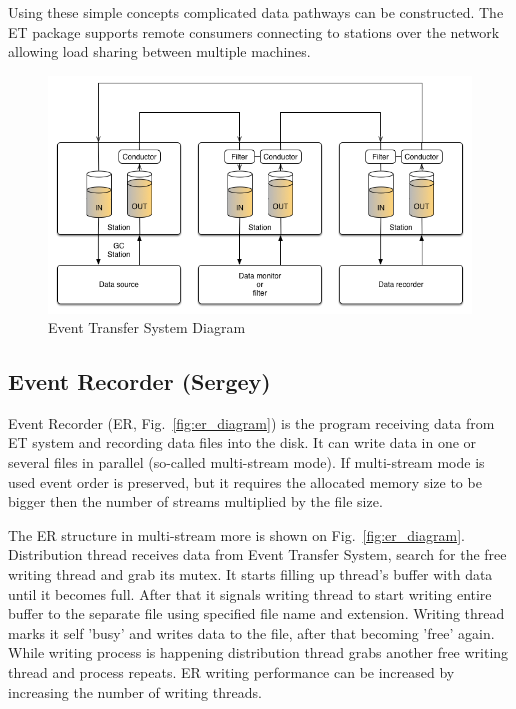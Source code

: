 Using these simple concepts complicated data pathways can be constructed. The ET package supports remote consumers connecting to stations over the network allowing load sharing between multiple machines. 

\begin{figure}[hbt]
	\centering
	\includegraphics[width=1.0\columnwidth,keepaspectratio]{img/et_diagram.png}
	\caption{Event Transfer System Diagram}
	\label{fig:et_diagram}
\end{figure}

\subsection{Event Recorder (Sergey)}

Event Recorder (ER, Fig.~\ref{fig:er_diagram}) is the program receiving data from ET system and recording data files into the disk. It can write data in one or several files in parallel (so-called multi-stream mode). If multi-stream mode is used event order is preserved, but it requires the allocated memory size to be bigger then the number of streams multiplied by the file size.

The ER structure in multi-stream more is shown on Fig.~\ref{fig:er_diagram}. Distribution thread receives data from Event Transfer System, search for the free writing thread and grab its mutex. It starts filling up thread's buffer with data until it becomes full. After that it signals writing thread to start writing entire buffer to the separate file using specified file name and extension. Writing thread marks it self 'busy' and writes data to the file, after that becoming 'free' again. While writing process is happening distribution thread grabs another free writing thread and process repeats. ER writing performance can be increased by increasing the number of writing threads.

